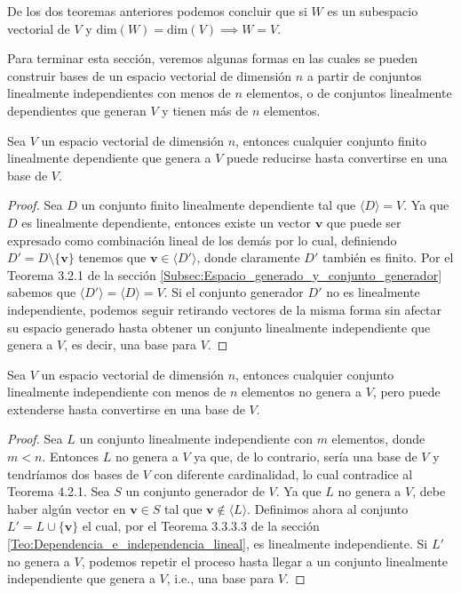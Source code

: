 \documentclass[12pt,dvipsnames]{article}
\newenvironment{teorema}[2][Teorema]{\begin{trivlist}
\item[\hskip \labelsep {\bfseries #1}\hskip \labelsep {\bfseries #2.}]}{\end{trivlist}}
\newenvironment{corolario}[2][Corolario]{\begin{trivlist}
\item[\hskip \labelsep {\bfseries #1}\hskip \labelsep {\bfseries #2.}]}{\end{trivlist}}
\begin{document}
\begin{corolario}{4.2.4}
    De los dos teoremas anteriores podemos concluir que si $W$ es un subespacio vectorial de $V$ y $\text{dim}(W)=\text{dim}(V)\implies W=V.$
\end{corolario}

Para terminar esta sección, veremos algunas formas en las cuales se pueden construir bases de un espacio vectorial de dimensión $n$ a partir de conjuntos linealmente independientes con menos de $n$ elementos, o de conjuntos linealmente dependientes que generan $V$ y tienen más de $n$ elementos.

\begin{teorema} {4.2.5}
    Sea $V$ un espacio vectorial de dimensión $n$, entonces cualquier conjunto finito linealmente dependiente que genera a $V$ puede reducirse hasta convertirse en una base de $V$.

\begin{proof}
    Sea $D$ un conjunto finito linealmente dependiente tal que $\langle D \rangle =V$. Ya que $D$ es linealmente dependiente, entonces existe un vector $\mathbf{v}$ que puede ser expresado como combinación lineal de los demás por lo cual, definiendo $D'=D\setminus\{\mathbf{v}\}$ tenemos que $\mathbf{v}\in\langle D' \rangle$, donde claramente $D'$ también es finito. Por el Teorema 3.2.1 de la sección \ref{Subsec:Espacio_generado_y_conjunto_generador} sabemos que $\langle D' \rangle =\langle D \rangle =V$. Si el conjunto generador $D'$ no es linealmente independiente, podemos seguir retirando vectores de la misma forma sin afectar su espacio generado hasta obtener un conjunto linealmente independiente que genera a $V$, es decir, una base para $V$.
\end{proof}

\end{teorema}

\begin{teorema} {4.2.6}
Sea $V$ un espacio vectorial de dimensión $n$, entonces cualquier conjunto linealmente independiente con menos de $n$ elementos no genera a $V$, pero puede extenderse hasta convertirse en una base de $V$.

\begin{proof}
Sea $L$ un conjunto linealmente independiente con $m$ elementos, donde $m<n$. Entonces $L$ no genera a $V$ ya que, de lo contrario, sería una base de $V$ y tendríamos dos bases de $V$ con diferente cardinalidad, lo cual contradice al Teorema 4.2.1. Sea $S$ un conjunto generador de $V$. Ya que $L$ no genera a $V$, debe haber algún vector en $\mathbf{v}\in S$ tal que $\mathbf{v}\notin \langle L \rangle$. Definimos ahora al conjunto $L'=L\cup \{\mathbf{v}\}$ el cual, por el Teorema 3.3.3.3 de la sección \ref{Teo:Dependencia_e_independencia_lineal}, es linealmente independiente. Si $L'$ no genera a $V$, podemos repetir el proceso hasta llegar a un conjunto linealmente independiente que genera a $V$, i.e., una base para $V$.
\end{proof}

\end{teorema}
\end{document}

